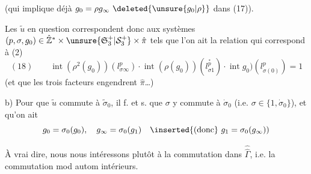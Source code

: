 (qui implique déjà $g_0=\rho g_\infty\ \deleted{\unsure{g_0|\rho}}$ dans (17)).

Les $\tilde u$ en question correspondent donc aux systèmes $(p,\sigma,g_0)\in\hat{\mathbb Z}^*\times\unsure{\mathfrak S_3^+|\mathcal S_3^+}\times\hat\pi$ tels que l'on ait la relation qui correspond à (2)
\[
(18)\qquad\operatorname{int}(\rho^2(g_0))(l_{\sigma\infty}^p)\cdot\operatorname{int}(\rho(g_0))(l_{\sigma1}^{\overset{*}{p}})\cdot\operatorname{int}g_0)(l_{\sigma(0)}^p)=1
\]
(et que les trois facteurs engendrent $\hat\pi$\ldots)

b) Pour que $\tilde u$ commute à $\tilde\sigma_0$, il f. et s. que $\sigma$ y commute à $\dot\sigma_0$ (i.e. $\sigma\in\{1,\dot\sigma_0\}$), et qu'on ait
\[
g_0=\sigma_0(g_0),\quad g_\infty=\sigma_0(g_1)\quad\inserted{\text{(donc}}\ g_1=\sigma_0(g_\infty))
\]



À vrai dire, nous nous intéressons plutôt à la commutation dans $\widehat{\widehat\Gamma}$, i.e. la commutation mod autom intérieurs.
